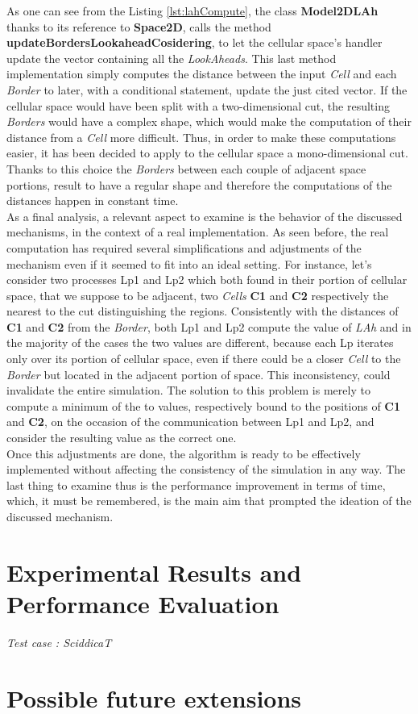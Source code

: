 \documentclass[12pt,a4paper,fleqn]{report}
\begin{document}
As one can see from the Listing \ref{lst:lahCompute}, the class \textbf{Model2DLAh} thanks to its reference to \textbf{Space2D}, calls the method \textbf{updateBordersLookaheadCosidering}, to let the cellular space's handler update the vector containing all the \textit{LookAheads}. This last method  implementation simply computes the distance between the input \textit{Cell} and each \textit{Border} to later, with a conditional statement, update the just cited vector. If the cellular space would have been split with a two-dimensional cut, the resulting \textit{Borders} would have a complex shape, which would make the computation of their distance from a \textit{Cell} more difficult. Thus, in order to make these computations easier, it has been decided to apply to the cellular space a mono-dimensional cut. Thanks to this choice the \textit{Borders} between each couple of adjacent space portions, result to have a regular shape and therefore the computations of the distances happen in constant time. \\
As a final analysis, a relevant aspect to examine is the behavior of the discussed mechanisms, in the context of a real implementation. As seen before, the real computation has required several simplifications and adjustments of the mechanism even if it seemed to fit into an ideal setting. For instance, let's consider two processes Lp1 and Lp2 which both found in their portion of cellular space, that we suppose to be adjacent, two \textit{Cells} \textbf{C1} and \textbf{C2} respectively the nearest to the cut distinguishing the regions. Consistently with the distances of \textbf{C1} and \textbf{C2} from the \textit{Border}, both Lp1 and Lp2 compute the value of \textit{LAh} and in the majority of the cases the two values are different, because each Lp iterates only over its portion of cellular space, even if there could be a closer \textit{Cell} to the \textit{Border} but located in the adjacent portion of space. This inconsistency, could invalidate the entire simulation. The solution to this problem is merely to compute a minimum of the to values, respectively bound to the positions of \textbf{C1} and \textbf{C2}, on the occasion of the communication between Lp1 and Lp2, and consider the resulting value as the correct one. \\
Once this adjustments are done, the algorithm is ready to be effectively implemented without affecting the consistency of the simulation in any way. The last thing to examine thus is the performance improvement in terms of time, which, it must be remembered, is the main aim that prompted the ideation of the discussed mechanism.
\newpage
\chapter{Experimental Results and Performance Evaluation}{\Large{\textit{Test case : SciddicaT}}}\\

\newpage
\chapter{Possible future extensions}

\nocite{0}
\nocite{1}
\nocite{2}
\nocite{3}
\printbibliography{}
\end{document}
